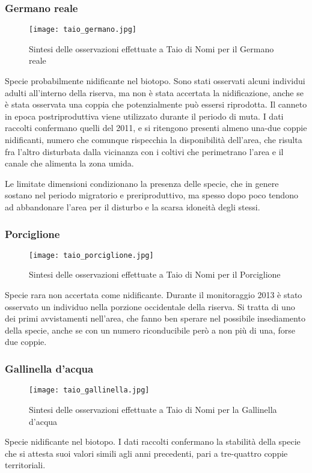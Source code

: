\documentclass[11pt,a4paper,twoside]{memoir}
\begin{document}
\subsubsection{Germano reale}
\vspace*{\fill}
\begin{figure}[H]
  \centering
  \texttt{[image: taio\_germano.jpg]}
  \caption{Sintesi delle osservazioni effettuate a Taio di Nomi per il Germano reale}
\end{figure}\vspace*{\fill}
Specie probabilmente nidificante nel biotopo. Sono stati osservati alcuni individui adulti all'interno della riserva, ma non è stata accertata la nidificazione, anche se è stata osservata una coppia che potenzialmente può essersi riprodotta. Il canneto in epoca postriproduttiva viene utilizzato durante il periodo di muta. I dati raccolti confermano quelli del 2011, e si ritengono presenti almeno una-due coppie nidificanti, numero che comunque rispecchia la disponibilità dell'area, che risulta fra l’altro disturbata dalla vicinanza con i coltivi che perimetrano l’area e il canale che alimenta la zona umida.

Le limitate dimensioni condizionano la presenza delle specie, che in genere sostano nel periodo migratorio e preriproduttivo, ma spesso dopo poco tendono ad abbandonare l’area per il disturbo e la scarsa idoneità degli stessi.

\subsubsection{Porciglione}
\vspace*{\fill}
\begin{figure}[H]
  \centering
  \texttt{[image: taio\_porciglione.jpg]}
  \caption{Sintesi delle osservazioni effettuate a Taio di Nomi per il Porciglione}
\end{figure}\vspace*{\fill}
Specie rara non accertata come nidificante. Durante il monitoraggio 2013 è stato osservato un individuo nella porzione occidentale della riserva. Si tratta di uno dei primi avvistamenti nell'area, che fanno ben sperare nel possibile insediamento della specie, anche se con un numero riconducibile però a non più di una, forse due coppie.

\subsubsection{Gallinella d'acqua}
\vspace*{\fill}
\begin{figure}[H]
  \centering
  \texttt{[image: taio\_gallinella.jpg]}
  \caption{Sintesi delle osservazioni effettuate a Taio di Nomi per la Gallinella d'acqua}
\end{figure}\vspace*{\fill}
Specie nidificante nel biotopo. I dati raccolti confermano la stabilità della specie che si attesta suoi valori simili agli anni precedenti, pari a tre-quattro coppie territoriali.
\end{document}
